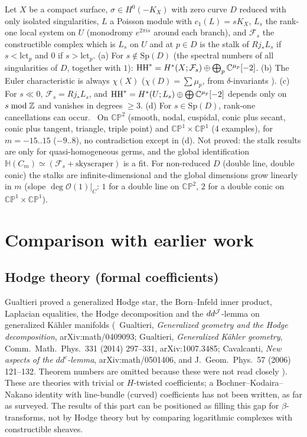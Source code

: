 \begin{conj}\tK
Let $X$ be a compact surface, $\sigma\in H^0(-K_X)$ with zero curve $D$ reduced with only isolated singularities, $L$ a Poisson module with $c_1(L)=sK_X$, $L_s$ the rank-one local system on $U$ (monodromy $e^{2\pi is}$ around each branch), and $\mathcal F_s$ the constructible complex which is $L_s$ on $U$ and at $p\in D$ is the stalk of $Rj_*L_s$ if $s<\mathrm{lct}_p$ and $0$ if $s>\mathrm{lct}_p$. (a) For $s\notin\mathrm{Sp}(D)$ (the spectral numbers of all singularities of $D$, together with $1$): $\mathrm{HH}^*=H^*(X;\mathcal F_s)\oplus\bigoplus_p\mathbb C^{\mu_p}[-2]$. (b) The Euler characteristic is always $\chi(X)$ ($\chi(D)=\sum\mu_p$, from $\delta$-invariants \tP). (c) For $s\ll0$, $\mathcal F_s=Rj_*L_s$, and $\mathrm{HH}^*=H^*(U;L_s)\oplus\bigoplus\mathbb C^{\mu_p}[-2]$ depends only on $s\bmod\mathbb Z$ and vanishes in degrees $\ge3$. (d) For $s\in\mathrm{Sp}(D)$, rank-one cancellations can occur.
\tV\ On $\mathbb{CP}^2$ (smooth, nodal, cuspidal, conic plus secant, conic plus tangent, triangle, triple point) and $\mathbb{CP}^1\times\mathbb{CP}^1$ (4 examples), for $m=-15..15$ ($-9..8$), no contradiction except in (d). Not proved: the stalk results are only for quasi-homogeneous germs, and the global identification $\mathbb H(C_m)\simeq(\mathcal F_s+\text{skyscraper})$ is a fit. For non-reduced $D$ (double line, double conic) the stalks are infinite-dimensional and the global dimensions grow linearly in $m$ (slope $\deg\mathcal O(1)|_C$: $1$ for a double line on $\mathbb{CP}^2$, $2$ for a double conic on $\mathbb{CP}^1\times\mathbb{CP}^1$).
\end{conj}

\section{Comparison with earlier work}\label{p1:sec:compare}
\subsection{Hodge theory (formal coefficients)}
Gualtieri proved a generalized Hodge star, the Born--Infeld inner product, Laplacian equalities, the Hodge decomposition and the $dd^{\mathcal J}$-lemma on generalized K\"ahler manifolds (\tC\ Gualtieri, \emph{Generalized geometry and the Hodge decomposition}, arXiv:math/0409093; Gualtieri, \emph{Generalized K\"ahler geometry}, Comm.\ Math.\ Phys.\ 331 (2014) 297--331, arXiv:1007.3485; Cavalcanti, \emph{New aspects of the $dd^c$-lemma}, arXiv:math/0501406, and J.\ Geom.\ Phys.\ 57 (2006) 121--132. Theorem numbers are omitted because these were not read closely \tQ). These are theories with trivial or $H$-twisted coefficients; a Bochner--Kodaira--Nakano identity with line-bundle (curved) coefficients has not been written, as far as surveyed. The results of this part can be positioned as filling this gap for $\beta$-transforms, not by Hodge theory but by comparing logarithmic complexes with constructible sheaves.

